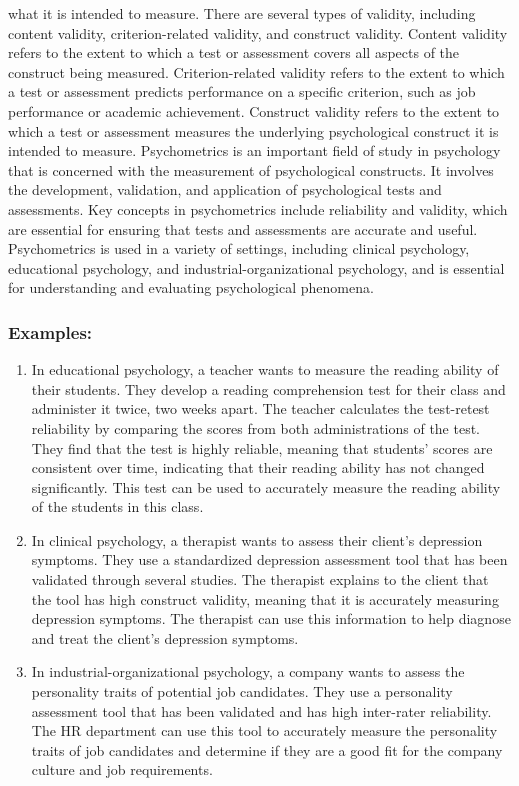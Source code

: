 \documentclass[
]{article}
\providecommand{\tightlist}{%
  \setlength{\itemsep}{0pt}\setlength{\parskip}{0pt}}
\begin{document}
what it is intended to measure. There are several types of validity,
including content validity, criterion-related validity, and construct
validity. Content validity refers to the extent to which a test or
assessment covers all aspects of the construct being measured.
Criterion-related validity refers to the extent to which a test or
assessment predicts performance on a specific criterion, such as job
performance or academic achievement. Construct validity refers to the
extent to which a test or assessment measures the underlying
psychological construct it is intended to measure. Psychometrics is an
important field of study in psychology that is concerned with the
measurement of psychological constructs. It involves the development,
validation, and application of psychological tests and assessments. Key
concepts in psychometrics include reliability and validity, which are
essential for ensuring that tests and assessments are accurate and
useful. Psychometrics is used in a variety of settings, including
clinical psychology, educational psychology, and
industrial-organizational psychology, and is essential for understanding
and evaluating psychological phenomena.

\hypertarget{examples}{%
\subsubsection{Examples:}\label{examples}}

\begin{enumerate}
\def\labelenumi{\arabic{enumi}.}
\tightlist
\item
  In educational psychology, a teacher wants to measure the reading
  ability of their students. They develop a reading comprehension test
  for their class and administer it twice, two weeks apart. The teacher
  calculates the test-retest reliability by comparing the scores from
  both administrations of the test. They find that the test is highly
  reliable, meaning that students’ scores are consistent over time,
  indicating that their reading ability has not changed significantly.
  This test can be used to accurately measure the reading ability of the
  students in this class.
\item
  In clinical psychology, a therapist wants to assess their client’s
  depression symptoms. They use a standardized depression assessment
  tool that has been validated through several studies. The therapist
  explains to the client that the tool has high construct validity,
  meaning that it is accurately measuring depression symptoms. The
  therapist can use this information to help diagnose and treat the
  client’s depression symptoms.
\item
  In industrial-organizational psychology, a company wants to assess the
  personality traits of potential job candidates. They use a personality
  assessment tool that has been validated and has high inter-rater
  reliability. The HR department can use this tool to accurately measure
  the personality traits of job candidates and determine if they are a
  good fit for the company culture and job requirements.
\end{enumerate}
\end{document}
